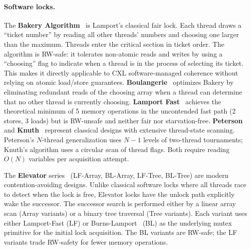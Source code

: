 \paragraph{Software locks.}
The \textbf{Bakery Algorithm}~\cite{lamportNewSolutionDijkstras1974} is Lamport's classical fair lock.
Each thread draws a ``ticket number'' by reading all other threads' numbers and choosing one larger than the maximum.
Threads enter the critical section in ticket order.
The algorithm is RW-safe: it tolerates non-atomic reads and writes by using a ``choosing'' flag to indicate when a thread is in the process of selecting its ticket.
This makes it directly applicable to CXL software-managed coherence without relying on atomic load/store guarantees.
\textbf{Boulangerie}~\cite{mosesHoodBakeryAlgorithm2015} optimizes Bakery by eliminating redundant reads of the choosing array when a thread can determine that no other thread is currently choosing.
\textbf{Lamport Fast}~\cite{lamportFastMutualExclusion1987} achieves the theoretical minimum of 5 memory operations in the uncontended fast path (2 stores, 3 loads) but is RW-unsafe and neither fair nor starvation-free.
\textbf{Peterson}~\cite{petersonMythsMutualExclusion1981} and \textbf{Knuth}~\cite{knuthAdditionalCommentsProblem1966} represent classical designs with extensive thread-state scanning.
Peterson's $N$-thread generalization uses $N-1$ levels of two-thread tournaments; Knuth's algorithm uses a circular scan of thread flags.
Both require reading $O(N)$ variables per acquisition attempt.

The \textbf{Elevator} series~\cite{buhrHighcontentionMutualExclusion2018} (LF-Array, BL-Array, LF-Tree, BL-Tree) are modern contention-avoiding designs.
Unlike classical software locks where all threads race to detect when the lock is free, Elevator locks have the unlock path explicitly wake the successor.
The successor search is performed either by a linear array scan (Array variants) or a binary tree traversal (Tree variants).
Each variant uses either Lamport-Fast (LF) or Burns-Lamport~\cite{burnsAllertonconf,hesselinkVerifyingSimplificationMutual2013} (BL) as the underlying mutex primitive for the initial lock acquisition.
The BL variants are RW-safe; the LF variants trade RW-safety for fewer memory operations.

